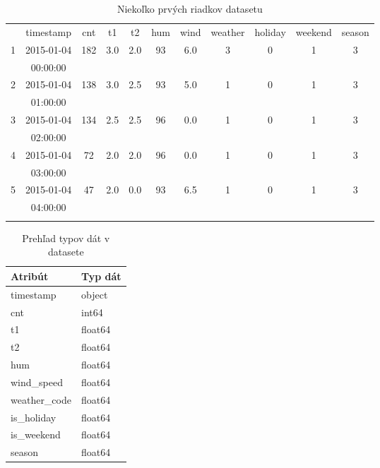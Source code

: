 \begin{table}[ht!]
\centering
\caption{Niekoľko prvých riadkov datasetu}\label{t:2}
\medskip
\small
\begin{tabular}{||c||c|c|c|c|c|c|c|c|c|c||}
\hhline{|t:==t:=========:t|}
\multicolumn{1}{||c||}{\textnumero} & timestamp & cnt & t1 & t2 & hum & wind & weather & holiday & weekend & season \\
\hhline{|:==:=========:|}
1 & 2015-01-04 & 182 & 3.0 & 2.0 & 93 & 6.0 & 3 & 0 & 1 & 3 \\
 & 00:00:00 & & & & & & & & & \\
\hhline{||-|-|-|-|-|-|-|-|-|-|-||}
2 & 2015-01-04 & 138 & 3.0 & 2.5 & 93 & 5.0 & 1 & 0 & 1 & 3 \\
 & 01:00:00 & & & & & & & & & \\
\hhline{||-|-|-|-|-|-|-|-|-|-|-||}
3 & 2015-01-04 & 134 & 2.5 & 2.5 & 96 & 0.0 & 1 & 0 & 1 & 3 \\
 & 02:00:00 & & & & & & & & & \\
\hhline{||-|-|-|-|-|-|-|-|-|-|-||}
4 & 2015-01-04 & 72 & 2.0 & 2.0 & 96 & 0.0 & 1 & 0 & 1 & 3 \\
 & 03:00:00 & & & & & & & & & \\
\hhline{||-|-|-|-|-|-|-|-|-|-|-||}
5 & 2015-01-04 & 47 & 2.0 & 0.0 & 93 & 6.5 & 1 & 0 & 1 & 3 \\
 & 04:00:00 & & & & & & & & & \\
\hhline{|b:==b:=========:b|}
\end{tabular}
\end{table}

\begin{table}[ht!]
\centering
\caption{Prehľad typov dát v datasete}\label{t:2}
\medskip
\begin{tabular}{||l||l||}
\hline
\textbf{Atribút} & \textbf{Typ dát} \\
\hline
timestamp & object \\
\hline
cnt & int64 \\
\hline
t1 & float64 \\
\hline
t2 & float64 \\
\hline
hum & float64 \\
\hline
wind\_speed & float64 \\
\hline
weather\_code & float64 \\
\hline
is\_holiday & float64 \\
\hline
is\_weekend & float64 \\
\hline
season & float64 \\
\hline
\end{tabular}
\end{table}

